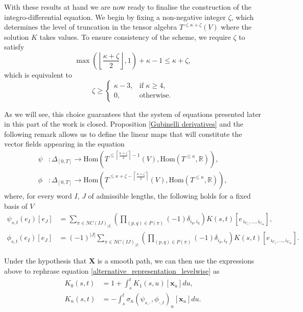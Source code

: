 \documentclass{article}%
\newcommand{\floor}[1]{\left \lfloor {#1}\right \rfloor}
\newcommand{\ceil}[1]{\left \lceil {#1}\right \rceil}
\begin{document}
With these results at hand we are now ready to finalise the construction of the integro-differential equation.\newline
We begin by fixing a non-negative integer $\zeta$, which determines the level of truncation in the tensor algebra $T^{\le \kappa + \zeta}(V)$ where the solution $K$ takes values. To ensure consistency of the scheme, we require $\zeta$ to satisfy
\[
\max\left(\floor{\frac{\kappa + \zeta}{2}}, 1\right) + \kappa - 1 \le \kappa + \zeta,
\]
which is equivalent to
\[
\zeta \ge
\begin{cases}
\kappa - 3, & \text{if } \kappa \ge 4,\\
0, & \text{otherwise}.
\end{cases}
\]

As we will see, this choice guarantees that the system of equations presented later in this part of the work is closed. \newline
Proposition \ref{Gubinelli derivatives} and the following remark allows us to define the linear maps that will constitute the vector fields appearing in the equation
\[
\begin{aligned}
    \psi&: \Delta_{[0, T]} \to \mathrm{Hom}( T^{\le \ceil{\frac{ \kappa + \zeta}{2}}-1}(V), \mathrm{Hom}(T^{\le \kappa}, \mathbb{R})), \\
    \phi&: \Delta_{[0, T]} \to \mathrm{Hom}( T^{\le \kappa + \zeta - \ceil{\frac{ \kappa + \zeta}{2}}}(V), \mathrm{Hom}(T^{\le \kappa}, \mathbb{R})),
\end{aligned}
\]
where, for every word $I$, $J$ of admissible lengths, the following holds for a fixed basis of $V$
\begin{align*}
\psi_{s,t}(e_I)[e_J]  &= 
\sum_{\pi \in NC(IJ)_{|I|}}
\left(
\prod_{(p,q) \in P(\pi)} (-1) \delta_{i_p,i_q}
\right)
K(s,t)[{e_{\,i_{U_1},\ldots,i_{U_m}}}],\\
\phi_{s,t}(e_I)[e_J]  &= (-1)^{|J|}
\sum_{\pi \in NC(IJ)_{|I|}}
\left(
\prod_{(p,q) \in P(\pi)} (-1) \delta_{i_p,i_q}
\right)
K(s,t)[{e_{\,i_{U_1},\ldots,i_{U_m}}}].  
\end{align*}

Under the hypothesis that $\mathbf{X}$ is a smooth path, we can then use the expressions above to rephrase 
equation \eqref{alternative_representation_levelwise} as 
\begin{equation*}
\begin{aligned}
K_{0}(s,t) 
&= 1 +  \int_s^t  K_{1}(s,u) [\boldsymbol{x}_u]  du,\\
K_{n}(s,t) 
&= -  \int_s^t \sigma_n( \psi_{s, \cdot}, \phi_{\cdot, t})_u  [\boldsymbol{x}_u]  du.
\end{aligned}
\end{equation*}
\end{document}
